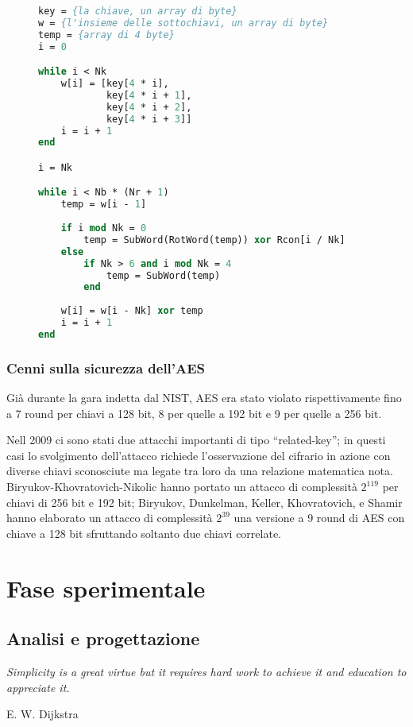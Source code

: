 \documentclass[12pt,a4paper,oneside]{book}
\begin{document}
\vspace*{10pt}
\begin{figure}
\begin{lstlisting}[caption={\textit{Procedura di espansione della chiave AES.}},label={cod:aes-keyexpansion},language=Pascal]
key = {la chiave, un array di byte}
w = {l'insieme delle sottochiavi, un array di byte}
temp = {array di 4 byte}
i = 0

while i < Nk
	w[i] = [key[4 * i], 
	        key[4 * i + 1], 
	        key[4 * i + 2], 
	        key[4 * i + 3]]
	i = i + 1
end

i = Nk

while i < Nb * (Nr + 1)
	temp = w[i - 1]
	
	if i mod Nk = 0
		temp = SubWord(RotWord(temp)) xor Rcon[i / Nk]
	else 
		if Nk > 6 and i mod Nk = 4
			temp = SubWord(temp)
		end
	
	w[i] = w[i - Nk] xor temp
	i = i + 1
end
\end{lstlisting}
\end{figure}

\section{Cenni sulla sicurezza dell'AES}

Già durante la gara indetta dal \ac{NIST}, \ac{AES} era stato violato rispettivamente fino a 7 round per chiavi a 128 bit, 8 per quelle a 192 bit e 9 per quelle a 256 bit\cite{bib:schneier}.

Nell 2009 ci sono stati due attacchi importanti di tipo ``related-key''; in questi casi lo svolgimento dell'attacco richiede l'osservazione del cifrario in azione con diverse chiavi sconosciute ma legate tra loro da una relazione matematica nota. Biryukov-Khovratovich-Nikolic hanno portato un attacco di complessità $2^{119}$ per chiavi di 256 bit e 192 bit\cite{bib:aes-attack1}; Biryukov, Dunkelman, Keller, Khovratovich, e Shamir hanno elaborato un attacco di complessità $2^{39}$ una versione a 9 round di \ac{AES} con chiave a 128 bit sfruttando soltanto due chiavi correlate\cite{bib:aes-attack2}.

\part{Fase sperimentale}

\chapter{Analisi e progettazione}
\linespread{1}
\epigraph{\textit{Simplicity is a great virtue but it requires hard work to achieve it and education to appreciate it.}}{E. W. Dijkstra}
\linespread{1.3}
\end{document}
